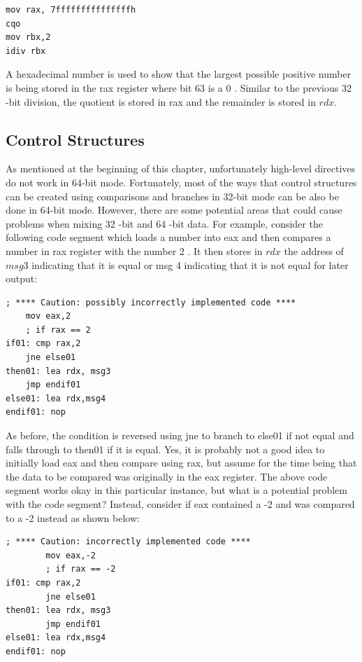 \documentclass[10pt]{book}
\begin{document}
\begin{verbatim}
mov rax, 7fffffffffffffffh
cqo
mov rbx,2
idiv rbx
\end{verbatim}

A hexadecimal number is used to show that the largest possible positive number is being stored in the rax register where bit 63 is a 0 . Similar to the previous 32 -bit division, the quotient is stored in rax and the remainder is stored in $r d x$.

\subsection{Control Structures}
As mentioned at the beginning of this chapter, unfortunately high-level directives do not work in 64-bit mode. Fortunately, most of the ways that control structures can be created using comparisons and branches in 32-bit mode can be also be done in 64-bit mode. However, there are some potential areas that could cause problems when mixing 32 -bit and 64 -bit data. For example, consider the following code segment which loads a number into eax and then compares a number in rax register with the number 2 . It then stores in $r d x$ the address of $m s g 3$ indicating that it is equal or msg 4 indicating that it is not equal for later output:

\begin{verbatim}
; **** Caution: possibly incorrectly implemented code ****
    mov eax,2
    ; if rax == 2
if01: cmp rax,2
    jne else01
then01: lea rdx, msg3
    jmp endif01
else01: lea rdx,msg4
endif01: nop
\end{verbatim}

As before, the condition is reversed using jne to branch to else01 if not equal and falls through to then01 if it is equal. Yes, it is probably not a good idea to initially load eax and then compare using rax, but assume for the time being that the data to be compared was originally in the eax register. The above code segment works okay in this particular instance, but what is a potential problem with the code segment? Instead, consider if eax contained a -2 and was compared to a -2 instead as shown below:

\begin{verbatim}
; **** Caution: incorrectly implemented code ****
        mov eax,-2
        ; if rax == -2
if01: cmp rax,2
        jne else01
then01: lea rdx, msg3
        jmp endif01
else01: lea rdx,msg4
endif01: nop
\end{verbatim}
\end{document}
